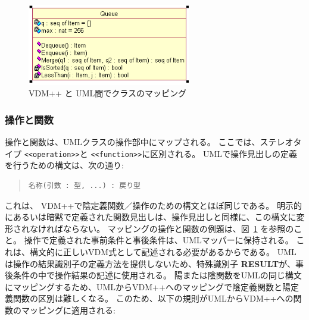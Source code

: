 \documentclass[\pformat,12pt]{jarticle}
\newcommand{\vdmpp}{VDM++}
\begin{document}
\begin{figure}[p]
\begin{center}
\hspace{-2cm}
\begin{minipage}[t]{2.5in}
\end{minipage} \ \
\begin{minipage}[t]{2in}
\vspace{2cm}
\includegraphics[width=2.8in]{queueClass}
\end{minipage}
\caption{\vdmpp{} と UML\label{fig:queue}間でクラスのマッピング　\label{fig:queue}}
\end{center}
\end{figure}

\subsubsection*{操作と関数}
  
操作と関数は、UMLクラスの操作部中にマップされる。
ここでは、ステレオタイプ {\tt <<operation>>}と {\tt <<function>>}に区別される。 
UMLで操作見出しの定義を行うための構文は、次の通り:

\begin{quote}
\begin{verbatim}
名称(引数 : 型, ...) : 戻り型  
\end{verbatim}
\end{quote}
  
これは、 \vdmpp{}で陰定義関数／操作のための構文とほぼ同じである。
明示的にあるいは暗黙で定義された関数見出しは、操作見出しと同様に、この構文に変形されなければならない。
マッピングの操作と関数の例題は、図~\ref{fig:queue} を参照のこと。
操作で定義された事前条件と事後条件は、UMLマッパーに保持される。
これは、構文的に正しいVDM式として記述される必要があるからである。
 UML は操作の結果識別子の定義方法を提供しないため、特殊識別子 \textbf{RESULT}が、事後条件の中で操作結果の記述に使用される。
陽または陰関数をUMLの同じ構文にマッピングするため、UMLから\vdmpp{}へのマッピングで陰定義関数と陽定義関数の区別は難しくなる。
このため、以下の規則がUMLから\vdmpp{}への関数のマッピングに適用される:
\end{document}
